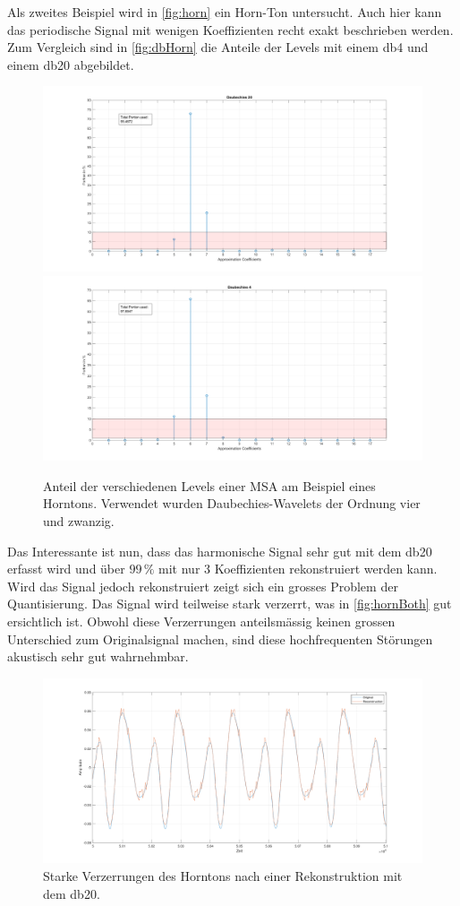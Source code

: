 \begin{refsection}
Als zweites Beispiel wird in \autoref{fig:horn} ein Horn-Ton untersucht.
%
Auch hier kann das periodische Signal mit wenigen Koeffizienten recht exakt beschrieben werden. 
Zum Vergleich sind in \autoref{fig:dbHorn} die Anteile der Levels mit einem db4 und einem db20 abgebildet.
\begin{figure}
\includegraphics[width=0.5\linewidth]{papers/compress/Bilder/frenchHorn_db20.pdf}
\includegraphics[width=0.5\linewidth]{papers/compress/Bilder/frenchHorn_db4.pdf}
\caption{Anteil der verschiedenen Levels einer MSA am Beispiel eines Horntons. Verwendet wurden Daubechies-Wavelets der Ordnung vier und zwanzig.}
\label{fig:dbHorn}
\end{figure}

Das Interessante ist nun, dass das harmonische Signal sehr gut mit dem db20 erfasst wird und über $99\,\text{\%}$ mit nur 3 Koeffizienten rekonstruiert werden kann.
Wird das Signal jedoch rekonstruiert zeigt sich ein grosses Problem der Quantisierung.
Das Signal wird teilweise stark verzerrt, was in \autoref{fig:hornBoth} gut ersichtlich ist.
Obwohl diese Verzerrungen anteilsmässig keinen grossen Unterschied zum Originalsignal machen, sind diese hochfrequenten Störungen akustisch sehr gut wahrnehmbar.

\begin{figure}
\centering
\includegraphics[width=\linewidth]{papers/compress/Bilder/hornBoth.pdf}
\caption{Starke Verzerrungen des Horntons nach einer Rekonstruktion mit dem db20.}
\label{fig:hornBoth}
\end{figure}


\end{refsection}

